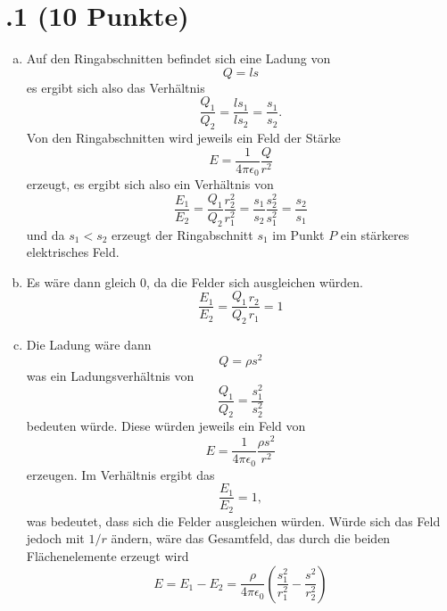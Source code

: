 \section*{\nr.1 \titone (10 Punkte)}
\begin{enumerate}[(a)]
\item Auf den Ringabschnitten befindet sich eine Ladung von
\begin{equation}
	Q=ls
\end{equation}
es ergibt sich also das Verhältnis
\begin{equation}
  \frac{Q_1}{Q_2}= \frac{ls_1}{ls_2} = \frac{s_1}{s_2}.
\end{equation}
Von den Ringabschnitten wird jeweils ein Feld der Stärke
\begin{equation}
  E= \frac{1}{4\pi\epsilon_0}\frac{Q}{r^2}
\end{equation}
erzeugt, es ergibt sich also ein Verhältnis von
\begin{equation}
  \frac{E_1}{E_2}=\frac{Q_1}{Q_2}\frac{r_2^2}{r_1^2}=\frac{s_1}{s_2}\frac{s_2^2}{s_1^2}=\frac{s_2}{s_1}
\end{equation}
und da $s_1<s_2$ erzeugt der Ringabschnitt $s_1$ im Punkt $P$ ein stärkeres elektrisches Feld.

\item Es wäre dann gleich $0$, da die Felder sich ausgleichen würden.
\begin{equation}
  \frac{E_1}{E_2}=\frac{Q_1}{Q_2}\frac{r_2}{r_1}=1
\end{equation}

\item Die Ladung wäre dann 
\begin{equation}
  Q=\rho s^2
\end{equation}
was ein Ladungsverhältnis von 
\begin{equation}
  \frac{Q_1}{Q_2}= \frac{s_1^2}{s_2^2}
\end{equation}
bedeuten würde. Diese würden jeweils ein Feld von
\begin{equation}
  E=\frac{1}{4\pi\epsilon_0}\frac{\rho s^2}{r^2}
\end{equation}
erzeugen.
Im Verhältnis ergibt das
\begin{equation}
  \frac{E_1}{E_2}=1, 
\end{equation}
was bedeutet, dass sich die Felder ausgleichen würden.
Würde sich das Feld jedoch mit $1/r$ ändern, wäre das Gesamtfeld, das durch die beiden Flächenelemente erzeugt wird
\begin{equation}
  E = E_1-E_2 = \frac{\rho}{4\pi\epsilon_0}\left(\frac{s_1^2}{r_1^2}-\frac{s^2}{r_2^2}\right)    
\end{equation}  


\end{enumerate}